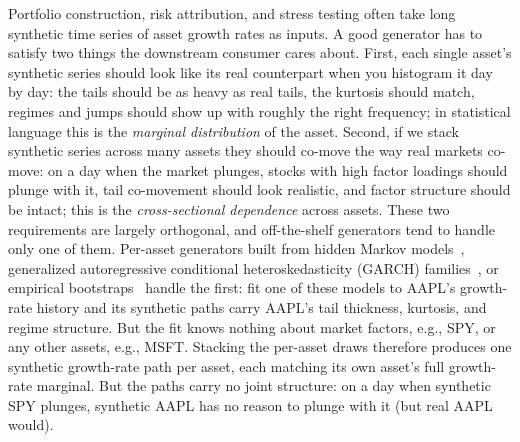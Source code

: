 
Portfolio construction, risk attribution, and stress testing often
take long synthetic time series of asset growth rates as inputs. A
good generator has to satisfy two things the downstream consumer
cares about. First, each single asset's synthetic series should look
like its real counterpart when you histogram it day by day: the tails
should be as heavy as real tails, the kurtosis should match, regimes
and jumps should show up with roughly the right frequency; in
statistical language this is the \emph{marginal distribution} of the
asset. Second, if we stack synthetic series across many assets they should
co-move the way real markets co-move: on a day when the market
plunges, stocks with high factor loadings should plunge with it, tail
co-movement should look realistic, and factor structure should be
intact; this is the \emph{cross-sectional dependence} across assets.
These two requirements are largely orthogonal, and off-the-shelf
generators tend to handle only one of them. Per-asset generators
built from hidden Markov models~\cite{hamilton1989}, generalized
autoregressive conditional heteroskedasticity (GARCH)
families~\cite{bollerslev1986}, or empirical
bootstraps~\cite{politisRomano1994} handle the first: fit one of
these models to AAPL's growth-rate history and its synthetic paths
carry AAPL's tail thickness, kurtosis, and regime structure. But the
fit knows nothing about market factors, e.g., SPY, or any other assets, e.g., MSFT. 
Stacking the per-asset draws therefore produces one synthetic
growth-rate path per asset, each matching its own asset's
full growth-rate marginal. But the paths carry no joint
structure: on a day when synthetic SPY plunges, synthetic AAPL has
no reason to plunge with it (but real AAPL would).

